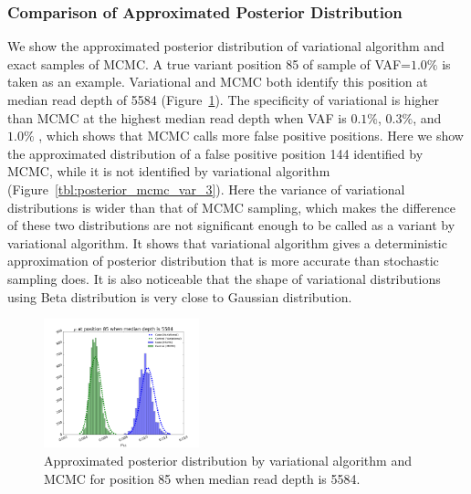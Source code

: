 \documentclass{article}
\begin{document}
\subsubsection{Comparison of Approximated Posterior Distribution}
We show the approximated posterior distribution of variational algorithm and exact samples of MCMC.
A true variant position 85 of sample of VAF=$1.0\%$ is taken as an example.
Variational and MCMC both identify this position at median read depth of 5584 (Figure~\ref{tbl:posterior_mcmc_var_1}).
The specificity of variational is higher than MCMC at the highest median read depth when VAF is $0.1\%$, $0.3\%$, and $1.0\%$ , which shows that MCMC calls more false positive positions.
Here we show the approximated distribution of a false positive position 144 identified by MCMC, while it is not identified by variational algorithm (Figure~\ref{tbl:posterior_mcmc_var_3}).
Here the variance of variational distributions is wider than that of MCMC sampling, which makes the difference of these two distributions are not significant enough to be called as a variant by variational algorithm. 
It shows that variational algorithm gives a deterministic approximation of posterior distribution that is more accurate than stochastic sampling does.
It is also noticeable that the shape of variational distributions using Beta distribution is very close to Gaussian distribution.

\begin{figure}[h]
\centering
\vspace{-10pt}
\includegraphics[width=0.4\textwidth]{figs/position_85_5584_mcmc_vs_var_mu.png}
\caption{Approximated posterior distribution by variational algorithm and MCMC for position 85 when median read depth is 5584.}
\vspace{-10pt}
\label{tbl:posterior_mcmc_var_1}
\end{figure}

\end{document}

